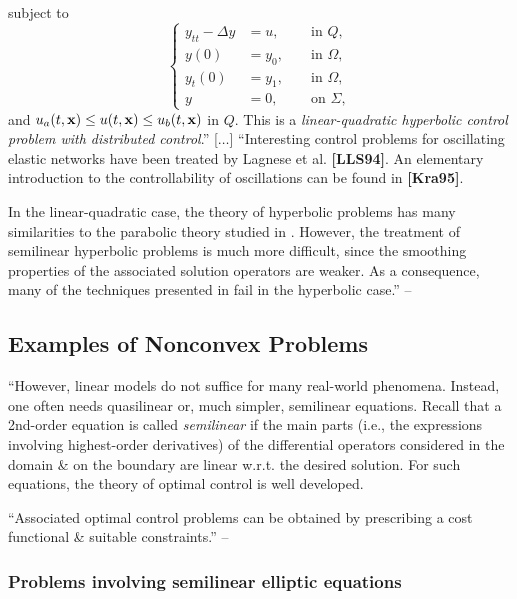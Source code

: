 \documentclass[oneside]{book}
\numberwithin{equation}{section}
\begin{document}
subject to
\begin{equation*}
	\left\{\begin{split}
		y_{tt} - \Delta y &= u,&&\mbox{ in } Q,\\
		y(0) &= y_0,&&\mbox{ in }\Omega,\\
		y_t(0) &= y_1,&&\mbox{ in }\Omega,\\
		y &= 0,&&\mbox{ on }\Sigma,
	\end{split}\right.
\end{equation*}
and $u_a(t,{\bf x})\le u(t,{\bf x})\le u_b(t,{\bf x})$ in $Q$. This is a \textit{linear-quadratic hyperbolic control problem with distributed control}.'' [$\ldots$] ``Interesting control problems for oscillating elastic networks have been treated by Lagnese et al. \textbf{[LLS94]}. An elementary introduction to the controllability of oscillations can be found in \textbf{[Kra95]}.

In the linear-quadratic case, the theory of hyperbolic problems has many similarities to the parabolic theory studied in \cite{Troltzsch2010}. However, the treatment of semilinear hyperbolic problems is much more difficult, since the smoothing properties of the associated solution operators are weaker. As a consequence, many of the techniques presented in \cite{Troltzsch2010} fail in the hyperbolic case.'' -- \cite[pp. 6--7]{Troltzsch2010}

\subsection{Examples of Nonconvex Problems}
``However, linear models do not suffice for many real-world phenomena. Instead, one often needs quasilinear or, much simpler, semilinear equations. Recall that a 2nd-order equation is called \textit{semilinear} if the main parts (i.e., the expressions involving highest-order derivatives) of the differential operators considered in the domain \& on the boundary are linear w.r.t. the desired solution. For such equations, the theory of optimal control is well developed.

 ``Associated optimal control problems can be obtained by prescribing a cost functional \& suitable constraints.'' -- \cite[p. 7]{Troltzsch2010}

\subsubsection{Problems involving semilinear elliptic equations}
\end{document}

